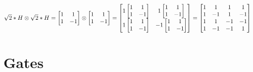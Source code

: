 \documentclass[11pt, fleqn]{article}
\begin{document}
$\sqrt{2}*H\otimes \sqrt{2}*H = \begin{bmatrix}1&1\\1&-1\end{bmatrix}\otimes
\begin{bmatrix}1&1\\1&-1\end{bmatrix} =
\begin{bmatrix}1\begin{bmatrix}1&1\\1&-1\end{bmatrix}&1\begin{bmatrix}1&1\\1&-1\end{bmatrix}\\1\begin{bmatrix}1&1\\1&-1\end{bmatrix}&-1\begin{bmatrix}1&1\\1&-1\end{bmatrix}\end{bmatrix}=
\begin{bmatrix}1&1&1&1\\1&-1&1&-1\\1&1&-1&-1\\1&-1&-1&1\\\end{bmatrix}
\\~\\$

\section{Gates}
\end{document}
